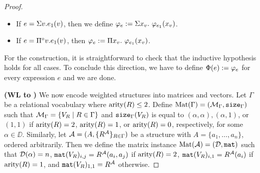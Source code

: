 \begin{proof}
\begin{itemize}
	\item If $e=\Sigma v. e_1(v)$, then we define $\varphi_e := \Sigma x_{v}. \  \varphi_{e_1}(x_v)$.

  \item If $e=\Pi^{\circ} v. e_1(v)$, then $\varphi_e := \Pi x_{v}.\  \varphi_{e_1}(x_v)$.
\end{itemize}
For the construction, it is straightforward to check that the inductive hypothesis holds for all cases. To conclude this direction, we have to define $\Phi(e) := \varphi_e$ for every expression $e$ and we are done.

\medskip
\noindent \textbf{(WL to \langprod)} We now encode weighted structures into matrices and vectors. Let $\Gamma$ be a relational vocabulary 
where $\operatorname{arity}(R) \leq 2$. 
Define $\text{Mat}(\Gamma) = (\mathcal{M}_\Gamma,\texttt{size}_\Gamma)$ such 
that $\mathcal{M}_\Gamma = \{ V_{R} \mid R \in \Gamma\}$ and $\texttt{size}_\Gamma(V_{R})$ is equal to 
$(\alpha, \alpha), (\alpha, 1)$, or $(1,1)$ if $\operatorname{arity}(R)=2$, $\operatorname{arity}(R)=1$, or $\operatorname{arity}(R)=0$, 
respectively, for some $\alpha \in \DD$. Similarly, let $\mathcal{A} = (A, \{R^{\mathcal{A}}\}_{R \in \Gamma})$ 
be a structure with $A = \{a_1, \ldots, a_n\}$, ordered arbitrarily.
Then we define the matrix instance $\text{Mat}(\mathcal{A}) = (\mathcal{D},\texttt{mat})$ such that $\mathcal{D}(\alpha) = n$, 
$\texttt{mat}(V_{R})_{i,j} = R^{\mathcal{A}}(a_i, a_j)$ if $\operatorname{arity}(R)=2$, $\texttt{mat}(V_{R})_{i,1} = R^{\mathcal{A}}(a_i)$ if $\operatorname{arity}(R)=1$, 
and $\texttt{mat}(V_{R})_{1,1} = R^{\mathcal{A}}$ otherwise.

\newcommand{\evarphi}{e_\varphi}


\end{proof}
